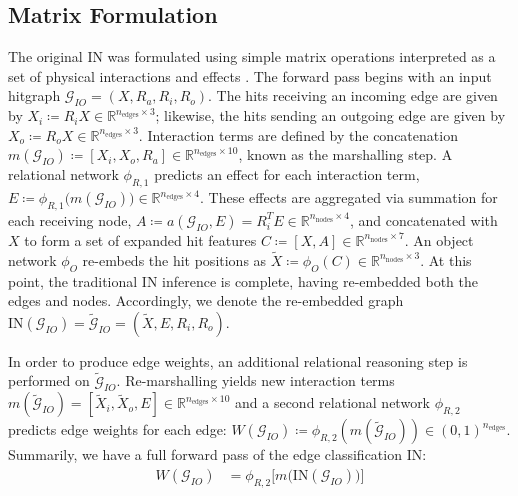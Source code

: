 \documentclass[twocolumn]{svjour3}
\newcommand{\nnodes}{\ensuremath{n_\mathrm{nodes}\xspace}}
\newcommand{\nedges}{\ensuremath{n_\mathrm{edges}\xspace}}
\begin{document}
\subsection{Matrix Formulation}\label{matrixformulation}
The original IN was formulated using simple matrix operations interpreted as a set of physical interactions and effects \cite{IN}. 
The forward pass begins with an input hitgraph $\mathcal{G}_{IO}=(X, R_a, R_i, R_o)$.
The hits receiving an incoming edge are given by $X_i \coloneqq R_iX \in\mathbb{R}^{ \nedges\times 3}$; likewise, the hits sending an outgoing edge are given by $X_o \coloneqq R_oX \in\mathbb{R}^{\nedges\times 3}$. 
Interaction terms are defined by the concatenation $m(\mathcal{G}_{IO})\coloneqq [X_i, X_o, R_a] \in \mathbb{R}^{ \nedges\times 10}$, known as the marshalling step. 
A relational network $\phi_{R,1}$ predicts an effect for each interaction term, $E\coloneqq \phi_{R,1}\big(m(\mathcal{G}_{IO})\big)\in\mathbb{R}^{\nedges\times 4}$. 
These effects are aggregated via summation for each receiving node, $A\coloneqq a(\mathcal{G}_{IO}, E) = R_i^TE\in \mathbb{R}^{\nnodes\times 4}$, and concatenated with $X$ to form a set of expanded hit features $C \coloneqq [X, A]\in\mathbb{R}^{\nnodes\times 7}$. 
An object network $\phi_O$ re-embeds the hit positions as $\tilde{X} \coloneqq \phi_O(C) \in \mathbb{R}^{\nnodes\times 3}$. 
At this point, the traditional IN inference is complete, having re-embedded both the edges and nodes. 
Accordingly, we denote the re-embedded graph $\mathrm{IN}(\mathcal{G}_{IO})=\tilde{\mathcal{G}}_{IO}=(\tilde{X}, E, R_i, R_o)$.

In order to produce edge weights, an additional relational reasoning step is performed on $\tilde{\mathcal{G}}_{IO}$. 
Re-marshalling yields new interaction terms $m(\tilde{\mathcal{G}}_{IO}) = [\tilde{X}_i, \tilde{X}_o, E]\in\mathbb{R}^{ \nedges\times 10}$ and a second relational network $\phi_{R,2}$ predicts edge weights for each edge: $W(\mathcal{G}_{IO})\coloneqq \phi_{R,2}(m(\tilde{\mathcal{G}}_{IO}))\in(0,1)^{\nedges}$. 
Summarily, we have a full forward pass of the edge classification IN: 
\begin{align}
    W(\mathcal{G}_{IO}) &= \phi_{R,2}\bigg[ m\big(\mathrm{IN}(\mathcal{G}_{IO})\big)\bigg] 
\end{align}
\end{document}
